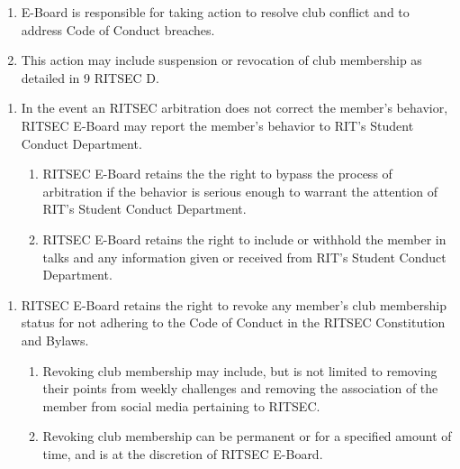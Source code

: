 
\begin{enumerate}
      \item E-Board is responsible for taking action to resolve club conflict and to
            address Code of Conduct breaches.
      \item This action may include suspension or revocation of club membership as detailed
            in 9 RITSEC D.
\end{enumerate}


\begin{enumerate}
      \item In the event an RITSEC arbitration does not correct the member's behavior,
            RITSEC E-Board may report the member's behavior to RIT's Student Conduct
            Department.
            \begin{enumerate}
                  \item RITSEC E-Board retains the the right to bypass the process of arbitration if
                        the behavior is serious enough to warrant the attention of RIT's Student
                        Conduct Department.
                  \item RITSEC E-Board retains the right to include or withhold the member in talks and
                        any information given or received from RIT's Student Conduct Department.
            \end{enumerate}
\end{enumerate}


\begin{enumerate}
      \item RITSEC E-Board retains the right to revoke any member's club membership status
            for not adhering to the Code of Conduct in the RITSEC Constitution and Bylaws.
            \begin{enumerate}
                  \item Revoking club membership may include, but is not limited to removing their
                        points from weekly challenges and removing the association of the member from
                        social media pertaining to RITSEC\@.
                  \item Revoking club membership can be permanent or for a specified amount of time,
                        and is at the discretion of RITSEC E-Board.
            \end{enumerate}
\end{enumerate}

